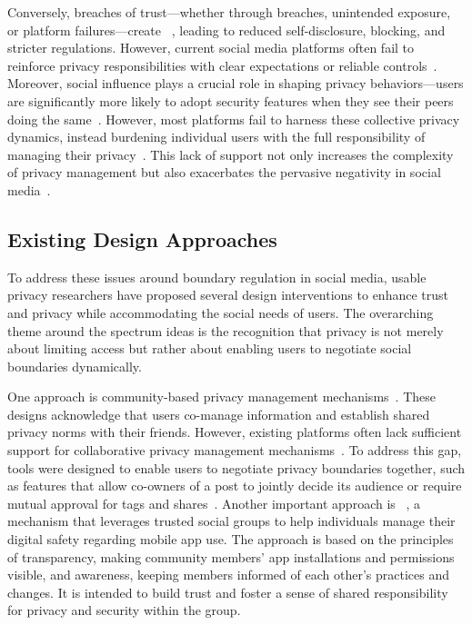 Conversely, breaches of trust---whether through breaches, unintended exposure, or platform failures---create ~\cite{Petronio2002-ce}, leading to reduced self-disclosure, blocking, and stricter regulations. However, current social media platforms often fail to reinforce privacy responsibilities with clear expectations or reliable controls~\cite{Choksi-2024-PrivacyGroupsMatters-b, Paci-2019-SurveyAccessSystems-a}. Moreover, social influence plays a crucial role in shaping privacy behaviors---users are significantly more likely to adopt security features when they see their peers doing the same~\cite{Akter-2023-EvaluatingImpactSecurity-h}. However, most platforms fail to harness these collective privacy dynamics, instead burdening individual users with the full responsibility of managing their privacy~\cite{Schnitzler-2020-SoKManagingData-h, Humbert-2019-SurveyInterdependentPrivacy-f, hargittai2016can, kim2025privacysocialnormsystematically}. This lack of support not only increases the complexity of privacy management but also exacerbates the pervasive negativity in social media~\cite{kim2025privacysocialnormsystematically}.

\subsection{Existing Design Approaches} %
To address these issues around boundary regulation in social media, usable privacy researchers have proposed several design interventions to enhance trust and privacy while accommodating the social needs of users. The overarching theme around the spectrum ideas is the recognition that privacy is not merely about limiting access but rather about enabling users to negotiate social boundaries dynamically. 

One approach is community-based privacy management mechanisms~\cite{Akter-2023-EvaluatingImpactSecurity-h}. These designs acknowledge that users co-manage information and establish shared privacy norms with their friends. However, existing platforms often lack sufficient support for collaborative privacy management mechanisms~\cite{Cho-2018-CollectivePrivacyValidation-h}. To address this gap, tools were designed to enable users to negotiate privacy boundaries together, such as features that allow co-owners of a post to jointly decide its audience or require mutual approval for tags and shares~\cite{Humbert-2019-SurveyInterdependentPrivacy-f, Wisniewski-2016-FramingMeasuringUsers-w}. Another important approach is ~\cite{Akter-2024-ExaminingCaregivingSecurity-n, Akter-2023-EvaluatingImpactSecurity-h}, a mechanism that leverages trusted social groups to help individuals manage their digital safety regarding mobile app use. The approach is based on the principles of transparency, making community members' app installations and permissions visible, and awareness, keeping members informed of each other's practices and changes. It is intended to build trust and foster a sense of shared responsibility for privacy and security within the group.

